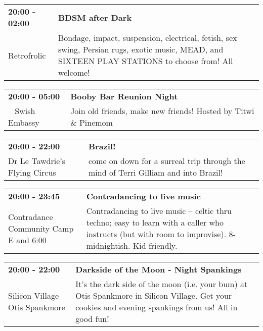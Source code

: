 \begin{tabular}{ p{1in} p{2.2in} }
    \textbf{20:00 - 02:00} & \textbf{BDSM after Dark} \\
    Retrofrolic \newline  & Bondage, impact, suspension, electrical, fetish, sex swing, Persian rugs, exotic music, MEAD, and SIXTEEN PLAY STATIONS to choose from! All welcome! \\
    \hline 
\end{tabular}
    
\begin{tabular}{ p{1in} p{2.2in} }
    \textbf{20:00 - 05:00} & \textbf{Booby Bar Reunion Night} \\
    ~ \newline Swish Embassy & Join old friends, make new friends! Hosted by Titwi \& Pinemom \\
    \hline 
\end{tabular}
    
\begin{tabular}{ p{1in} p{2.2in} }
    \textbf{20:00 - 22:00} & \textbf{Brazil!} \\
    Dr Le Tawdrie's Flying Circus \newline  & come on down for a surreal trip through the mind of Terri Gilliam and into Brazil! \\
    \hline 
\end{tabular}
    
\begin{tabular}{ p{1in} p{2.2in} }
    \textbf{20:00 - 23:45} & \textbf{Contradancing to live music} \\
    Contradance Community Camp \newline E  and 6:00 & Contradancing to live music -- celtic thru techno; easy to learn with a caller who instructs (but with room to improvise). 8-midnightish. Kid friendly. \\
    \hline 
\end{tabular}
    
\begin{tabular}{ p{1in} p{2.2in} }
    \textbf{20:00 - 22:00} & \textbf{Darkside of the Moon - Night Spankings} \\
    Silicon Village \newline Otis Spankmore & It's the dark side of the moon (i.e. your bum) at Otis Spankmore in Silicon Village. Get your cookies and evening spankings from us! All in good fun! \\
    \hline 
\end{tabular}
    
